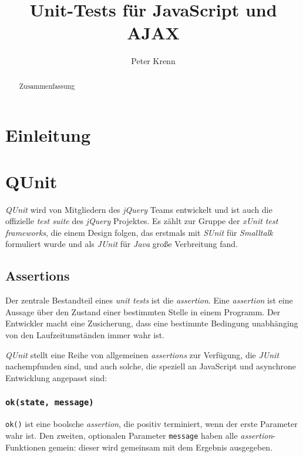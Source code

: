\documentclass[11pt, a4paper]{article}
\title{Unit-Tests für JavaScript und AJAX}
\author{Peter Krenn}
\begin{document}
\maketitle

\begin{abstract}
Zusammenfassung
\end{abstract}

\tableofcontents

\section{Einleitung}

\section{QUnit}

\emph{QUnit}\cite{zaefferer_qunit_2011} wird von Mitgliedern des \emph{jQuery}
Teams\cite{resig_jquery_2011} entwickelt und ist auch die offizielle
\emph{test suite} des \emph{jQuery} Projektes. Es zählt zur Gruppe der
\emph{xUnit test frameworks}\cite{fowler_xunit_2010}, die einem Design folgen,
das erstmals mit \emph{SUnit}\cite{beck_simple_1994} für \emph{Smalltalk} formuliert
wurde und als \emph{JUnit} für \emph{Java} große Verbreitung fand.

\subsection{Assertions}

Der zentrale Bestandteil eines \emph{unit tests} ist die \emph{assertion}. Eine
\emph{assertion} ist eine Aussage über den Zustand einer bestimmten Stelle in
einem Programm\cite{wikipedia_assertion_2011}. Der Entwickler macht eine
Zusicherung, dass eine bestimmte Bedingung unabhänging von den Laufzeitumständen
immer wahr ist.

\emph{QUnit} stellt eine Reihe von allgemeinen \emph{assertions} zur Verfügung,
die \emph{JUnit} nachempfunden sind, und auch solche, die speziell an JavaScript
und asynchrone Entwicklung angepasst sind\cite{zaefferer_qunit_2011}:

\subsubsection*{\texttt{ok(state, message)}}

\texttt{ok()} ist eine boolsche \emph{assertion}, die positiv terminiert, wenn der
erste Parameter wahr ist. Den zweiten, optionalen Parameter \texttt{message} haben alle
\emph{assertion}-Funktionen gemein: dieser wird gemeinsam mit dem Ergebnis
ausgegeben.
\end{document}
